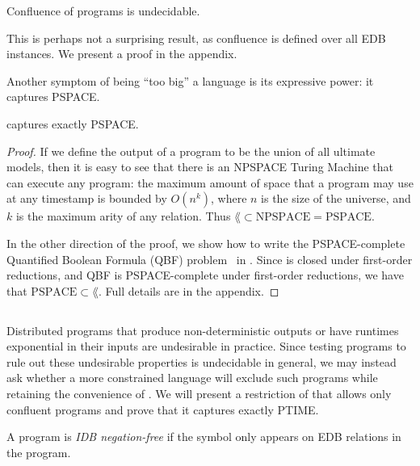 \begin{lemma}
\label{lem:confluence-undecidable}
Confluence of \lang programs is undecidable.
\end{lemma}
This is perhaps not a surprising result, as confluence is defined over all EDB instances.  We present a proof in the appendix.


Another symptom of \lang being ``too big'' a language is its expressive power: it captures PSPACE.  

\begin{lemma}
\label{lem:lang-pspace}
\lang captures exactly PSPACE.
\end{lemma}

\begin{proof}
If we define the output of a \lang program to be the union of all ultimate models, then it is easy to see that there is an NPSPACE Turing Machine that can execute any \lang program: the maximum amount of space that a \lang program may use at any timestamp is bounded by $O(n^k)$, where $n$ is the size of the universe, and $k$ is the maximum arity of any relation.  Thus $\lang \subset \text{NPSPACE} = \text{PSPACE}$.

In the other direction of the proof, we show how to write the PSPACE-complete Quantified Boolean Formula (QBF) problem~\cite{garey-johnson} in \lang. Since \lang is closed under first-order reductions, and QBF is PSPACE-complete under first-order reductions, we have that $\text{PSPACE} \subset \lang$.  Full details are in the appendix.
\end{proof}

\subsection{\large \bf \slang}

Distributed programs that produce non-deterministic outputs or have runtimes
exponential in their inputs are undesirable in practice.  Since testing \lang
programs to rule out these undesirable properties is undecidable in general, we
may instead ask whether a more constrained language will exclude such programs
while retaining the convenience of \lang.  We will present a restriction of
\lang that allows only confluent programs and prove that it captures exactly
PTIME.

\begin{definition}
A \lang program is {\em IDB negation-free} if the \dedalus{!} symbol only appears on EDB relations in the program.
\end{definition}

